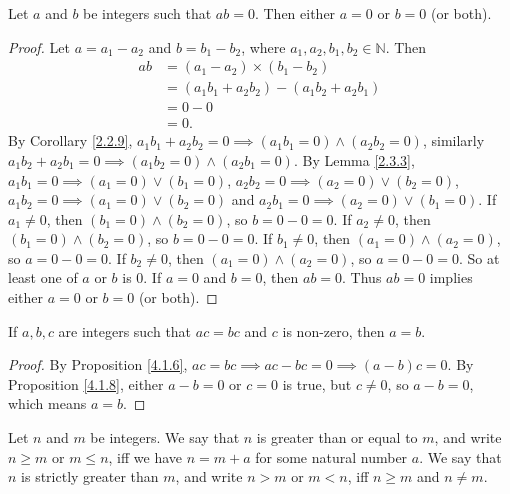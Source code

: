 \begin{proposition}\label{4.1.8}
Let \(a\) and \(b\) be integers such that \(ab = 0\).
Then either \(a = 0\) or \(b = 0\) (or both).
\end{proposition}

\begin{proof}
Let \(a = a_1 - a_2\) and \(b = b_1 - b_2\), where \(a_1, a_2, b_1, b_2 \in \mathds{N}\).
Then
\begin{align*}
ab &= (a_1 - a_2) \times (b_1 - b_2) \\
&= (a_1b_1 + a_2b_2) - (a_1b_2 + a_2b_1) \\
&= 0 - 0 \\
&= 0.
\end{align*}
By Corollary \ref{2.2.9}, \(a_1b_1 + a_2b_2 = 0 \implies (a_1b_1 = 0) \land (a_2b_2 = 0)\), similarly \(a_1b_2 + a_2b_1 = 0 \implies (a_1b_2 = 0) \land (a_2b_1 = 0)\).
By Lemma \ref{2.3.3}, \(a_1b_1 = 0 \implies (a_1 = 0) \lor (b_1 = 0)\), \(a_2b_2 = 0 \implies (a_2 = 0) \lor (b_2 = 0)\), \(a_1b_2 = 0 \implies (a_1 = 0) \lor (b_2 = 0)\) and \(a_2b_1 = 0 \implies (a_2 = 0) \lor (b_1 = 0)\).
If \(a_1 \neq 0\), then \((b_1 = 0) \land (b_2 = 0)\), so \(b = 0 - 0 = 0\).
If \(a_2 \neq 0\), then \((b_1 = 0) \land (b_2 = 0)\), so \(b = 0 - 0 = 0\).
If \(b_1 \neq 0\), then \((a_1 = 0) \land (a_2 = 0)\), so \(a = 0 - 0 = 0\).
If \(b_2 \neq 0\), then \((a_1 = 0) \land (a_2 = 0)\), so \(a = 0 - 0 = 0\).
So at least one of \(a\) or \(b\) is \(0\).
If \(a = 0\) and \(b = 0\), then \(ab = 0\).
Thus \(ab = 0\) implies either \(a = 0\) or \(b = 0\) (or both).
\end{proof}

\begin{corollary}\label{4.1.6}
If \(a, b, c\) are integers such that \(ac = bc\) and \(c\) is non-zero, then \(a = b\).
\end{corollary}

\begin{proof}
By Proposition \ref{4.1.6}, \(ac = bc \implies ac - bc = 0 \implies (a - b)c = 0\).
By Proposition \ref{4.1.8}, either \(a - b = 0\) or \(c = 0\) is true, but \(c \neq 0\), so \(a - b = 0\), which means \(a = b\).
\end{proof}

\begin{definition}\label{4.1.10}
Let \(n\) and \(m\) be integers.
We say that \(n\) is greater than or equal to \(m\), and write \(n \geq m\) or \(m \leq n\), iff we have \(n = m + a\) for some natural number \(a\).
We say that \(n\) is strictly greater than \(m\), and write \(n > m\) or \(m < n\), iff \(n \geq m\) and \(n \neq m\).
\end{definition}

